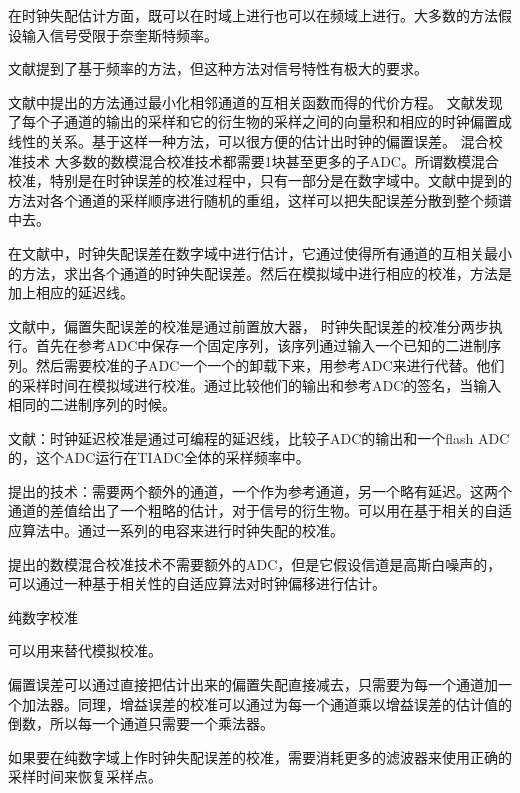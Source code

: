 				在时钟失配估计方面，既可以在时域上进行也可以在频域上进行。大多数的方法假设输入信号受限于奈奎斯特频率。\par
				
				文献\cite{divi2009blind}提到了基于频率的方法，但这种方法对信号特性有极大的要求。
				
				文献\cite {luo2013coordinated}中提出的方法通过最小化相邻通道的互相关函数而得的代价方程。
				文献\cite {le201422}发现了每个子通道的输出的采样和它的衍生物的采样之间的向量积和相应的时钟偏置成线性的关系。基于这样一种方法，可以很方便的估计出时钟的偏置误差。
				混合校准技术
				大多数的数模混合校准技术都需要1块甚至更多的子ADC。所谓数模混合校准，特别是在时钟误差的校准过程中，只有一部分是在数字域中。文献\cite{vogel2004compensation}\cite{el2003new}\cite {vogel2004compensation}中提到的方法对各个通道的采样顺序进行随机的重组，这样可以把失配误差分散到整个频谱中去。
				
				在文献中，时钟失配误差在数字域中进行估计，它通过使得所有通道的互相关最小的方法，求出各个通道的时钟失配误差。然后在模拟域中进行相应的校准，方法是加上相应的延迟线。
				
				文献中，偏置失配误差的校准是通过前置放大器，
				时钟失配误差的校准分两步执行。首先在参考ADC中保存一个固定序列，该序列通过输入一个已知的二进制序列。然后需要校准的子ADC一个一个的卸载下来，用参考ADC来进行代替。他们的采样时间在模拟域进行校准。通过比较他们的输出和参考ADC的签名，当输入相同的二进制序列的时候。				
				
				文献：时钟延迟校准是通过可编程的延迟线，比较子ADC的输出和一个flash ADC的，这个ADC运行在TIADC全体的采样频率中。
				
				提出的技术：需要两个额外的通道，一个作为参考通道，另一个略有延迟。这两个通道的差值给出了一个粗略的估计，对于信号的衍生物。可以用在基于相关的自适应算法中。通过一系列的电容来进行时钟失配的校准。
				
				提出的数模混合校准技术不需要额外的ADC，但是它假设信道是高斯白噪声的，可以通过一种基于相关性的自适应算法对时钟偏移进行估计。
				
				纯数字校准
				
				可以用来替代模拟校准。
				
				偏置误差可以通过直接把估计出来的偏置失配直接减去，只需要为每一个通道加一个加法器。同理，增益误差的校准可以通过为每一个通道乘以增益误差的估计值的倒数，所以每一个通道只需要一个乘法器。\par
				如果要在纯数字域上作时钟失配误差的校准，需要消耗更多的滤波器来使用正确的采样时间来恢复采样点。
				
